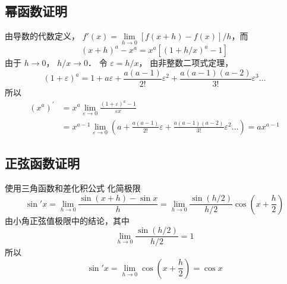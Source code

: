 \subsection{幂函数证明}
由导数的代数定义， $f'\left( x \right) = \mathop {\lim }\limits_{h \to 0} [{f\left( {x + h} \right) - f\left( x \right)}]/{h}$，而
\begin{equation}
{\left( {x + h} \right)^a} - {x^a} = {x^a}[{\left( {1 + h/x} \right)^a} - 1]
\end{equation}
由于 $h \to 0$，  $h/x \to 0$． 令 $\varepsilon  = h/x$， 由非整数二项式定理，
\begin{equation}
{\left( {1 + \varepsilon } \right)^a} = 1 + a\varepsilon  + \frac{a(a - 1)}{2!}{\varepsilon ^2} + \frac{a\left( {a - 1} \right)\left( {a - 2} \right)}{3!} {\varepsilon ^3}\dots
\end{equation}
所以
\begin{equation}\begin{aligned}
{\left( {{x^a}} \right)^\prime } &= {x^a}\mathop {\lim }\limits_{\varepsilon  \to 0} \frac{( 1 + \varepsilon )^a - 1}{\varepsilon x} \\
&= {x^{a - 1}}\mathop {\lim }\limits_{\varepsilon  \to 0} \left( {a + \frac{{a\left( {a - 1} \right)}}{{2!}}\varepsilon  + \frac{{a\left( {a - 1} \right)\left( {a - 2} \right)}}{{3!}}{\varepsilon ^2}\dots} \right) = a{x^{a - 1}}
\end{aligned}\end{equation}

\subsection{正弦函数证明}
使用三角函数和差化积公式%
化简极限
\begin{equation}
\sin'x = \mathop {\lim }\limits_{h \to 0} \frac{{\sin (x + h) - \sin x}}{h} = \mathop {\lim }\limits_{h \to 0} \frac{{\sin (h/2)}}{{h/2}}\cos \left( {x + \frac{h}{2}} \right)
\end{equation}
由小角正弦值极限中的结论，其中
\begin{equation}
\lim\limits_{h \to 0} \frac{\sin (h/2)}{h/2} = 1
\end{equation}
所以
\begin{equation}
\sin'x =  \mathop {\lim }\limits_{h \to 0}\cos \left( {x + \frac{h}{2}} \right) = \cos x
\end{equation}

